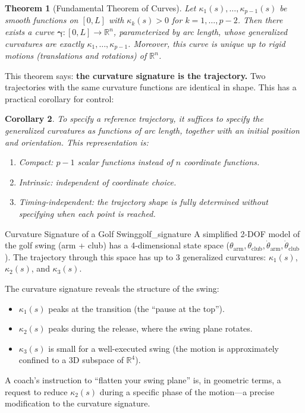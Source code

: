 \documentclass[12pt, openany]{book}
\theoremstyle{plain}
\newtheorem{theorem}{Theorem}[chapter]
\newtheorem{corollary}[theorem]{Corollary}
\newcommand{\traj}{\bm{\gamma}}
\newcommand{\Reals}{\mathbb{R}}
\begin{document}
\begin{theorem}[Fundamental Theorem of Curves]\label{thm:fundamental}
  Let $\kappa_1(s), \ldots, \kappa_{p-1}(s)$ be smooth functions on
  $[0, L]$ with $\kappa_k(s) > 0$ for $k = 1, \ldots, p-2$. Then there
  exists a curve $\traj: [0, L] \to \Reals^n$, parameterized by arc length,
  whose generalized curvatures are exactly $\kappa_1, \ldots, \kappa_{p-1}$.
  Moreover, this curve is unique up to rigid motions (translations and
  rotations) of $\Reals^n$.
\end{theorem}

This theorem says: \textbf{the curvature signature is the trajectory.} Two
trajectories with the same curvature functions are identical in shape. This has
a practical corollary for control:

\begin{corollary}
  To specify a reference trajectory, it suffices to specify the generalized
  curvatures as functions of arc length, together with an initial position
  and orientation. This representation is:
  \begin{enumerate}[label=(\roman*)]
    \item \emph{Compact}: $p - 1$ scalar functions instead of $n$ coordinate
      functions.
    \item \emph{Intrinsic}: independent of coordinate choice.
    \item \emph{Timing-independent}: the trajectory shape is fully determined
      without specifying when each point is reached.
  \end{enumerate}
\end{corollary}

\begin{example}{Curvature Signature of a Golf Swing}{golf_signature}
  A simplified 2-DOF model of the golf swing (arm + club) has a 4-dimensional
  state space ($\theta_{\text{arm}}, \theta_{\text{club}}, \dot{\theta}_{\text{arm}},
  \dot{\theta}_{\text{club}}$). The trajectory through this space has up to 3
  generalized curvatures: $\kappa_1(s)$, $\kappa_2(s)$, and $\kappa_3(s)$.

  The curvature signature reveals the structure of the swing:
  \begin{itemize}[leftmargin=1cm]
    \item $\kappa_1(s)$ peaks at the transition (the ``pause at the top'').
    \item $\kappa_2(s)$ peaks during the release, where the swing plane rotates.
    \item $\kappa_3(s)$ is small for a well-executed swing (the motion is
      approximately confined to a 3D subspace of $\Reals^4$).
  \end{itemize}

  A coach's instruction to ``flatten your swing plane'' is, in geometric terms,
  a request to reduce $\kappa_2(s)$ during a specific phase of the motion---a
  precise modification to the curvature signature.
\end{example}
\end{document}
